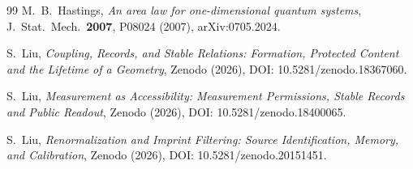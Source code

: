 \documentclass[12pt,a4paper]{article}
\begin{document}
\begin{thebibliography}{99}
M.~B.~Hastings,
\emph{An area law for one-dimensional quantum systems},
J.\ Stat.\ Mech.\ \textbf{2007}, P08024 (2007),
arXiv:0705.2024.

S.~Liu, \emph{Coupling, Records, and Stable Relations: Formation, Protected Content and the Lifetime of a Geometry}, Zenodo (2026), DOI: 10.5281/zenodo.18367060.

S.~Liu, \emph{Measurement as Accessibility: Measurement Permissions, Stable Records and Public Readout}, Zenodo (2026), DOI: 10.5281/zenodo.18400065.

S.~Liu, \emph{Renormalization and Imprint Filtering: Source Identification, Memory, and Calibration}, Zenodo (2026), DOI: 10.5281/zenodo.20151451.

\end{thebibliography}
\end{document}
